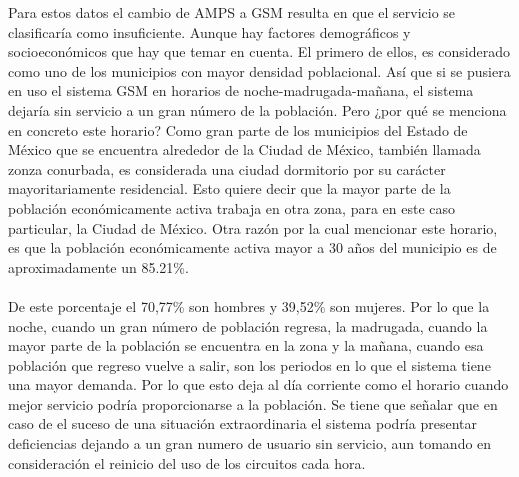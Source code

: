 \documentclass[11pt,letterpaper]{article}
\begin{document}
Para estos datos el cambio de AMPS a GSM resulta en que el servicio se clasificaría como 
insuficiente. Aunque hay factores demográficos y socioeconómicos que hay que temar en 
cuenta. El primero de ellos, es considerado como uno de los municipios con mayor densidad 
poblacional. Así que si se pusiera en uso el sistema GSM en horarios de noche-madrugada-mañana, 
el sistema dejaría sin servicio a un gran número de la población. Pero ¿por qué se menciona 
en concreto este horario? Como gran parte de los municipios del Estado de México que se 
encuentra alrededor de la Ciudad de México, también llamada zonza conurbada, es considerada 
una ciudad dormitorio por su carácter mayoritariamente residencial. Esto quiere decir que 
la mayor parte de la población económicamente activa trabaja en otra zona, para en este caso 
particular, la Ciudad de México. Otra razón por la cual mencionar este horario, es que la 
población económicamente activa mayor a 30 años del municipio es de aproximadamente un 85.21\%. 
\\ \\
De este porcentaje el 70,77\% son hombres y 39,52\% son mujeres. Por lo que la noche, cuando 
un gran número de población regresa, la madrugada, cuando la mayor parte de la población se 
encuentra en la zona y la mañana, cuando esa población que regreso vuelve a salir, son los 
periodos en lo que el sistema tiene una mayor demanda. Por lo que esto deja al día corriente 
como el horario cuando mejor servicio podría proporcionarse a la población. Se tiene que 
señalar que en caso de el suceso de una situación extraordinaria el sistema podría presentar 
deficiencias dejando a un gran numero de usuario sin servicio, aun tomando en consideración 
el reinicio del uso de los circuitos cada hora.
\end{document}
